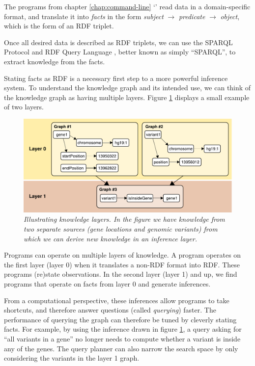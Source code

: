   The programs from chapter \ref{chap:command-line}
  {\color{LinkGray}`'} read data in a
  domain-specific format, and translate it into \emph{facts} in the form
  \emph{subject} $\rightarrow$ \emph{predicate} $\rightarrow$
  \emph{object}, which is the form of an RDF triplet.

  Once all desired data is described as RDF triplets, we can use the SPARQL
  Protocol and RDF Query Language \citep{sparql-11}, better known as simply
  ``SPARQL'', to extract knowledge from the facts.

  Stating facts as RDF is a necessary first step to a more powerful inference
  system.  To understand the knowledge graph and its intended use, we can
  think of the knowledge graph as having multiple layers.  Figure
  \ref{fig:layered-knowledge} displays a small example of two layers.

  \begin{figure}[h]
    \begin{center}
    \includegraphics[width=1.0\textwidth]{figures/layered-knowledge.pdf}
    \end{center}
    \caption{\textit{Illustrating knowledge layers.  In the figure we have
        knowledge from two separate sources (gene locations and genomic
        variants) from which we can derive new knowledge in an inference
        layer.}}
    \label{fig:layered-knowledge}
  \end{figure}

  Programs can operate on multiple layers of knowledge.  A program operates
  on the first layer (layer 0) when it translates a non-RDF format into RDF.
  These programs (re)state observations.  In the second layer (layer 1) and
  up, we find programs that operate on facts from layer 0 and generate
  inferences.

  From a computational perspective, these inferences allow programs to take
  shortcuts, and therefore answer questions (called \emph{querying}) faster.
  The performance of querying the graph can therefore be tuned by cleverly
  stating facts.  For example, by using the inference drawn in figure
  \ref{fig:layered-knowledge}, a query asking for ``all variants in a gene''
  no longer needs to compute whether a variant is inside any of the
  genes.  The query planner can also narrow the search space by only
  considering the variants in the layer 1 graph.

